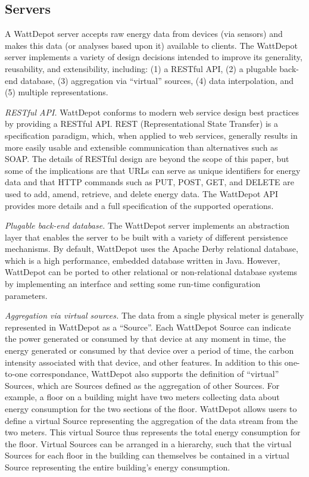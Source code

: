 \documentclass[conference,compsoc]{IEEEtran}
\begin{document}
\subsection{Servers}

A WattDepot server accepts raw energy data from devices (via sensors) and
makes this data (or analyses based upon it) available to clients.  The
WattDepot server implements a variety of design decisions intended to
improve its generality, reusability, and extensibility, including: (1) a
RESTful API, (2) a plugable back-end database, (3) aggregation via
``virtual'' sources, (4) data interpolation, and (5) multiple
representations.

{\em RESTful API.} WattDepot conforms to modern web service design best
practices by providing a RESTful API.  REST (Representational State
Transfer) \cite{REST} is a specification paradigm, which, when applied to
web services, generally results in more easily usable and extensible
communication than alternatives such as SOAP. The details of RESTful design
are beyond the scope of this paper, but some of the implications are that
URLs can serve as unique identifiers for energy data and that HTTP commands
such as PUT, POST, GET, and DELETE are used to add, amend, retrieve, and
delete energy data. The WattDepot API \cite{WattDepotAPI} provides more
details and a full specification of the supported operations.

{\em Plugable back-end database.} The WattDepot server implements an
abstraction layer that enables the server to be built with a variety of
different persistence mechanisms.  By default, WattDepot uses the Apache
Derby relational database, which is a high performance, embedded database
written in Java.  However, WattDepot can be ported to other relational or
non-relational database systems by implementing an interface and setting some 
run-time configuration parameters. 

{\em Aggregation via virtual sources.} The data from a single physical
meter is generally represented in WattDepot as a ``Source''.  Each
WattDepot Source can indicate the power generated or consumed by that
device at any moment in time, the energy generated or consumed by that
device over a period of time, the carbon intensity associated with that
device, and other features.  In addition to this one-to-one correspondance,
WattDepot also supports the definition of ``virtual'' Sources, which are
Sources defined as the aggregation of other Sources.  For example, a floor
on a building might have two meters collecting data about energy
consumption for the two sections of the floor.  WattDepot allows users to
define a virtual Source representing the aggregation of the data stream
from the two meters.  This virtual Source thus represents the total energy
consumption for the floor. Virtual Sources can be arranged in a hierarchy,
such that the virtual Sources for each floor in the building can themselves
be contained in a virtual Source representing the entire building's energy
consumption.
\end{document}
